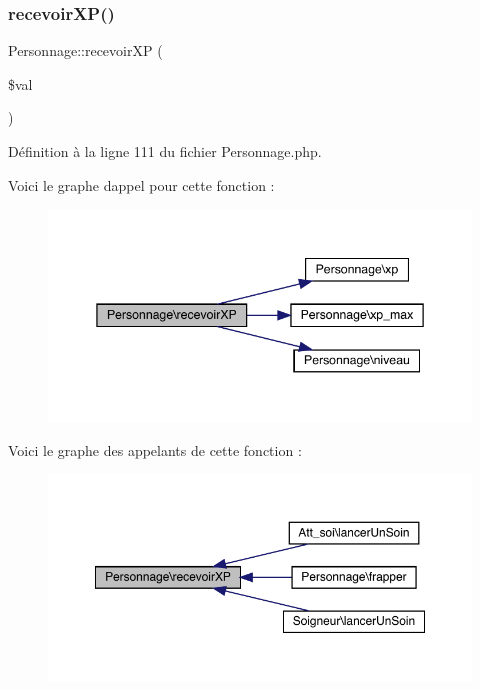 \subsubsection{\texorpdfstring{recevoir\+X\+P()}{recevoirXP()}}
{\footnotesize\ttfamily Personnage\+::recevoir\+XP (\begin{DoxyParamCaption}\item[{}]{\$val }\end{DoxyParamCaption})}



Définition à la ligne 111 du fichier Personnage.\+php.

Voici le graphe d\textquotesingle{}appel pour cette fonction \+:\nopagebreak
\begin{figure}[H]
\begin{center}
\leavevmode
\includegraphics[width=345pt]{class_personnage_aa64edf7d4c080193213b12643eb05a5d_cgraph}
\end{center}
\end{figure}
Voici le graphe des appelants de cette fonction \+:\nopagebreak
\begin{figure}[H]
\begin{center}
\leavevmode
\includegraphics[width=350pt]{class_personnage_aa64edf7d4c080193213b12643eb05a5d_icgraph}
\end{center}
\end{figure}
\mbox{\label{class_personnage_ab0503fe49e1a5403fe6d43d7d424e3ef}} 
